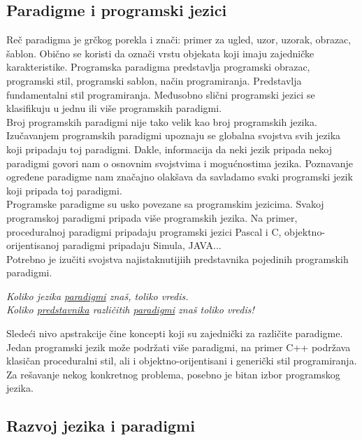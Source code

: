 \documentclass[../main.tex]{subfiles}
\begin{document}
\subsection{Paradigme i programski jezici}										

Reč paradigma je grčkog porekla i znači: primer za ugled, uzor, uzorak, obrazac, šablon. Obično se koristi da označi vrstu objekata koji imaju zajedničke karakteristike. Programska paradigma predstavlja programski obrazac, programski stil, programski sablon, način programiranja. Predstavlja fundamentalni stil programiranja. Međusobno slični programski jezici se klasifikuju u jednu ili više programskih paradigmi.\\
Broj programskih paradigmi nije tako velik kao broj programskih jezika. Izučavanjem programskih paradigmi upoznaju se globalna svojstva svih jezika koji pripadaju toj paradigmi. Dakle, informacija da neki jezik pripada nekoj paradigmi govori nam o osnovnim svojstvima i mogućnostima jezika. Poznavanje ogređene paradigme nam značajno olakšava da savladamo svaki programski jezik koji pripada toj paradigmi.\\
Programske paradigme su usko povezane sa programskim jezicima. Svakoj programskoj paradigmi pripada više programskih jezika. Na primer, proceduralnoj paradigmi pripadaju programski jezici Pascal i C, objektno-orijentisanoj paradigmi pripadaju Simula, JAVA...\\
Potrebno je izučiti svojstva najistaknutijiih predstavnika pojedinih programskih paradigmi.
\begin{center}
{\it Koliko jezika \underline{paradigmi} znaš, toliko vredis.\\
Koliko \underline{predstavnika} različitih \underline{paradigmi} znaš toliko vredis!}
\end{center}

Sledeći nivo apstrakcije čine koncepti koji su zajednički za različite paradigme. Jedan programski jezik može podržati više paradigmi, na primer C++ podržava klasičan proceduralni stil, ali i objektno-orijentisani i generički stil programiranja.\\
Za rešavanje nekog konkretnog problema, posebno je bitan izbor programskog jezika.

\pagebreak

\subsection{Razvoj jezika i paradigmi}
									
\end{document}

